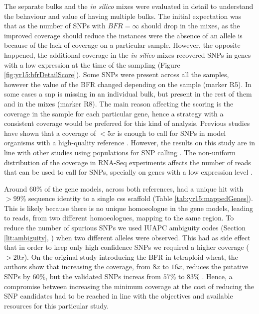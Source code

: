 The separate bulks and the \textit{in silico} mixes were evaluated in detail to understand the behaviour and value of having multiple bulks. 
The initial expectation was that as the number of SNPs with $BFR=\infty$ should drop in the mixes, as the improved coverage should reduce the instances were the absence of an allele is because of the lack of coverage on a particular sample. 
However, the opposite happened, the additional coverage in the \textit{in silico} mixes recovered SNPs in genes with a low expression at the time of the sampling (Figure \ref{fig:yr15:bfrDetailScore}).  
Some SNPs were present across all the samples, however the value of the BFR changed depending on the sample (marker R5). 
In some cases a \gls{snp} is missing in an individual bulk, but present in the rest of them and in the mixes (marker R8). 
The main reason affecting the scoring is the coverage in the sample for each particular gene, hence a strategy with a consistent coverage would be preferred for this kind of analysis.  
Previous studies have shown that a coverage of $<5x$ is enough to call for SNPs in model organisms with a high-quality reference \citep{Schneeberger2011}.
However, the results on this study are in line with other studies using populations for SNP calling \citep{Abe2012,Takagi2013}. 
The non-uniform distribution of the coverage in RNA-Seq experiments affects the number of reads that can be used to call for SNPs, specially on genes with a low expression level \citep{Mortazavi2008}. 



Around $60\%$ of the gene models, across both references, had a unique hit with $>99\%$ sequence identity to a single \acrshort{css} scaffold (Table \ref{tab:yr15:mappedGenes}). 
This is likely because there is no unique homoeologue in the gene models, leading to reads, from two different homoeologues, mapping to the same region.
To reduce the number of spurious SNPs we used IUAPC ambiguity codes (Section \ref{lit:ambiguity}, \citet{Cornish-Bowden1985}) when two different alleles were observed.
This had as side effect that in order to keep only high confidence SNPs we required a higher coverage ($>20x$). 
On the original study introducing the BFR in tetraploid wheat, the authors show that increasing the coverage, from $8x$ to $16x$, reduces the putative SNPs by $60\%$, but the validated SNPs increas from $57\%$ to $83\%$ \citep{Trick2012}. 
Hence, a compromise between increasing the minimum coverage at the cost of reducing the SNP candidates had to be reached in line with the objectives and available resources for this particular study. 

